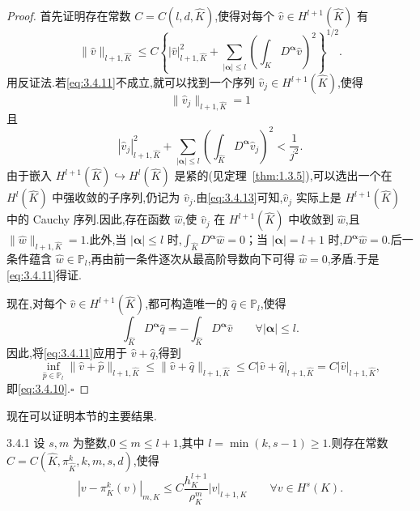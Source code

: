 \begin{proof}
首先证明存在常数 \(C=C(l,d,\widehat K)\),使得对每个 \(\widehat v\in H^{l+1}(\widehat K)\) 有
\begin{equation}\label{eq:3.4.11}
  \|\widehat v\|_{l+1,\widehat K}
  \le C\left\{|\widehat v|_{l+1,\widehat K}^2
       +\sum_{|\boldsymbol{\alpha}|\le l}\left(\int_{\widehat K}D^{\boldsymbol{\alpha}}\widehat v\right)^2
     \right\}^{1/2}.
\end{equation}
用反证法.若\eqref{eq:3.4.11}不成立,就可以找到一个序列 \(\widehat v_j\in H^{l+1}(\widehat K)\),使得
\begin{equation}\label{eq:3.4.12}
  \|\widehat v_j\|_{l+1,\widehat K}=1
\end{equation}
且
\begin{equation}\label{eq:3.4.13}
  |\widehat v_j|_{l+1,\widehat K}^2
  +\sum_{|\boldsymbol{\alpha}|\le l}\left(\int_{\widehat K}D^{\boldsymbol{\alpha}}\widehat v_j\right)^2
  <\frac1{j^2}.
\end{equation}
由于嵌入 \(H^{l+1}(\widehat K)\hookrightarrow H^l(\widehat K)\) 是紧的(见定理~\ref{thm:1.3.5}),可以选出一个在 \(H^l(\widehat K)\) 中强收敛的子序列,仍记为 \(\widehat v_j\).由\eqref{eq:3.4.13}可知,\(\widehat v_j\) 实际上是 \(H^{l+1}(\widehat K)\) 中的 Cauchy 序列.因此,存在函数 \(\widehat w\),使 \(\widehat v_j\) 在 \(H^{l+1}(\widehat K)\) 中收敛到 \(\widehat w\),且 \(\|\widehat w\|_{l+1,\widehat K}=1\).此外,当 \(|\boldsymbol{\alpha}|\le l\) 时,\(\int_{\widehat K}D^{\boldsymbol{\alpha}}\widehat w=0\)；当 \(|\boldsymbol{\alpha}|=l+1\) 时,\(D^{\boldsymbol{\alpha}}\widehat w=0\).后一条件蕴含 \(\widehat w\in\mathbb P_l\),再由前一条件逐次从最高阶导数向下可得 \(\widehat w=0\),矛盾.于是\eqref{eq:3.4.11}得证.

现在,对每个 \(\widehat v\in H^{l+1}(\widehat K)\),都可构造唯一的 \(\widehat q\in\mathbb P_l\),使得
\[
  \int_{\widehat K}D^{\boldsymbol{\alpha}}\widehat q
   =-\int_{\widehat K}D^{\boldsymbol{\alpha}}\widehat v
   \qquad \forall|\boldsymbol{\alpha}|\le l.
\]
因此,将\eqref{eq:3.4.11}应用于 \(\widehat v+\widehat q\),得到
\[
  \inf_{\widehat p\in\mathbb P_l}\|\widehat v+\widehat p\|_{l+1,\widehat K}
  \le\|\widehat v+\widehat q\|_{l+1,\widehat K}
  \le C|\widehat v+\widehat q|_{l+1,\widehat K}
  =C|\widehat v|_{l+1,\widehat K},
\]
即\eqref{eq:3.4.10}.\hfill\(\square\)
\end{proof}

现在可以证明本节的主要结果.

\begin{theorem}[]{3.4.1}
设 \(s,m\) 为整数,\(0\le m\le l+1\),其中 \(l=\min(k,s-1)\ge1\).则存在常数 \(C=C(\widehat K,\pi_{\widehat K}^k,k,m,s,d)\),使得
\begin{equation}\label{eq:3.4.14}
  |v-\pi_K^k(v)|_{m,K}\le C\frac{h_K^{l+1}}{\rho_K^m}|v|_{l+1,K}
  \qquad \forall v\in H^s(K).
\end{equation}
\end{theorem}

